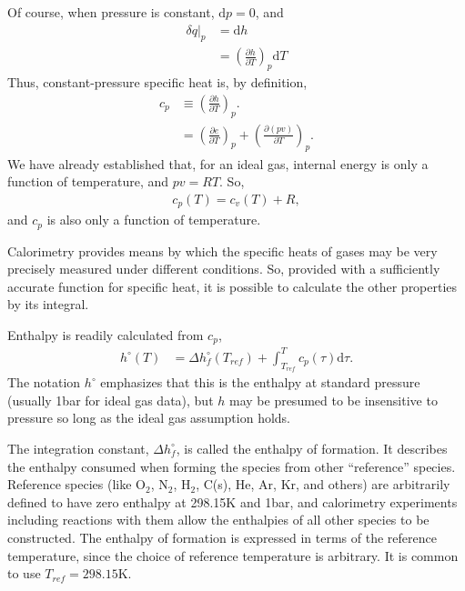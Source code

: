 \documentclass[letterpaper,11pt]{article}
\def\d{\mathrm{d}}
\begin{document}
Of course, when pressure is constant, $\d p=0$, and 
\begin{align}
\delta q |_p &= \d h\nonumber\\
 &= \left( \frac{\partial h}{\partial T}\right)_p \d T
\end{align}
Thus, constant-pressure specific heat is, by definition,
\begin{align}
c_p &\equiv \left( \frac{\partial h}{\partial T}\right)_p.\\
 &= \left(\frac{\partial e}{\partial T}\right)_p + \left(\frac{\partial (pv)}{\partial T}\right)_p.
\end{align}
We have already established that, for an ideal gas, internal energy is only a function of temperature, and $pv = RT$.  So,
\begin{align}
c_p(T) = c_v(T) + R,
\end{align}
and $c_p$ is also only a function of temperature.

Calorimetry provides means by which the specific heats of gases may be very precisely measured under different conditions.  So, provided with a sufficiently accurate function for specific heat, it is possible to calculate the other properties by its integral.

Enthalpy is readily calculated from $c_p$,
\begin{align}
h^\circ(T) &= \Delta h^\circ_f(T_{ref}) + \int_{T_{ref}}^T c_p(\tau) \d \tau.\label{eqn:ig:enthalpy}
\end{align}
The notation $h^\circ$ emphasizes that this is the enthalpy at standard pressure (usually 1bar for ideal gas data), but $h$ may be presumed to be insensitive to pressure so long as the ideal gas assumption holds.  

The integration constant, $\Delta h^\circ_f$, is called the enthalpy of formation.  It describes the enthalpy consumed when forming the species from other ``reference'' species.  Reference species (like O$_2$, N$_2$, H$_2$, C(s), He, Ar, Kr, and others) are arbitrarily defined to have zero enthalpy at 298.15K and 1bar, and calorimetry experiments including reactions with them allow the enthalpies of all other species to be constructed.  The enthalpy of formation is expressed in terms of the reference temperature, since the choice of reference temperature is arbitrary.  It is common to use $T_{ref} = 298.15$K.
\end{document}
